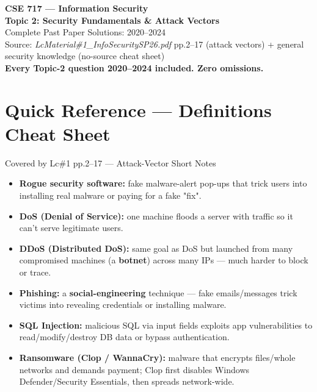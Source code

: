 \documentclass[12pt,a4paper]{article}
\begin{document}
\begin{center}
{\LARGE\bfseries\color{folblue} CSE 717 --- Information Security}\\[4pt]
{\large\bfseries Topic 2: Security Fundamentals \& Attack Vectors}\\[2pt]
{\large Complete Past Paper Solutions: 2020--2024}\\[6pt]
{\normalsize Source: \textit{LcMaterial\#1\_InfoSecuritySP26.pdf} pp.2--17 (attack vectors) + general security knowledge (no-source cheat sheet)}\\[2pt]
{\normalsize\color{darkred}\textbf{Every Topic-2 question 2020--2024 included. Zero omissions.}}
\end{center}

\tableofcontents
\newpage

\section*{Quick Reference --- Definitions Cheat Sheet}

\begin{keybox}{Covered by Lc\#1 pp.2--17 --- Attack-Vector Short Notes}
\begin{itemize}[noitemsep]
  \item \textbf{Rogue security software:} fake malware-alert pop-ups that trick users into installing real malware or paying for a fake "fix".
  \item \textbf{DoS (Denial of Service):} one machine floods a server with traffic so it can't serve legitimate users.
  \item \textbf{DDoS (Distributed DoS):} same goal as DoS but launched from many compromised machines (a \textbf{botnet}) across many IPs --- much harder to block or trace.
  \item \textbf{Phishing:} a \textbf{social-engineering} technique --- fake emails/messages trick victims into revealing credentials or installing malware.
  \item \textbf{SQL Injection:} malicious SQL via input fields exploits app vulnerabilities to read/modify/destroy DB data or bypass authentication.
  \item \textbf{Ransomware (Clop / WannaCry):} malware that encrypts files/whole networks and demands payment; Clop first disables Windows Defender/Security Essentials, then spreads network-wide.
\end{itemize}
\end{keybox}
\end{document}
